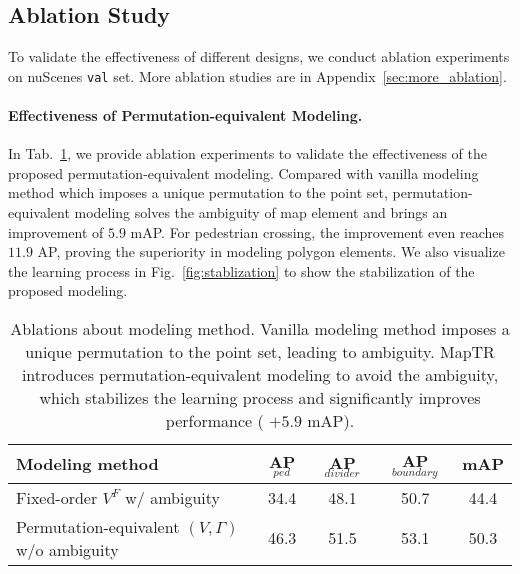 \documentclass{article} \usepackage{iclr2023_conference,times}
\begin{document}
\subsection{Ablation Study}
\label{sec:ablation}

To validate the effectiveness of different designs, we conduct ablation experiments on nuScenes \texttt{val} set. More ablation studies are in Appendix~\ref{sec:more_ablation}.

\paragraph{Effectiveness of Permutation-equivalent Modeling.}
In Tab.~\ref{tab:abla-modeling}, we provide ablation experiments to validate the effectiveness of the proposed permutation-equivalent modeling. Compared with vanilla modeling method which imposes a unique permutation to the point set, permutation-equivalent modeling solves the ambiguity of map element and brings an improvement of $5.9$ mAP.
For pedestrian crossing, the improvement even reaches $11.9$ AP, proving the superiority in modeling polygon elements. We also visualize the learning process in Fig.~\ref{fig:stablization} to show the stabilization of the proposed modeling.

\begin{table}[ht]
\begin{center}
\begin{tabular}{l|ccc|c}
\hline
\rowcolor{Gray}
Modeling method & AP$_{\textit{ped}}$ & AP$_{\textit{divider}}$ & AP$_{\textit{boundary}}$ & mAP\\
\toprule
Fixed-order $V^F$ w/ ambiguity   &34.4&48.1&50.7&44.4 \\
Permutation-equivalent $(V,\Gamma)$ w/o ambiguity &\cellcolor{blue!10}46.3&\cellcolor{blue!10}51.5&\cellcolor{blue!10}53.1&\cellcolor{blue!10}50.3\\
\bottomrule
\end{tabular}
\end{center}
\vspace*{-0.45cm}
\caption{Ablations about modeling method. Vanilla modeling method imposes a unique permutation to the point set, leading to ambiguity. MapTR introduces permutation-equivalent modeling to avoid the ambiguity, which stabilizes the learning process and significantly improves performance ( $+5.9$ mAP).}
\label{tab:abla-modeling}
\vspace*{-0.35cm}
\end{table}
\end{document}
